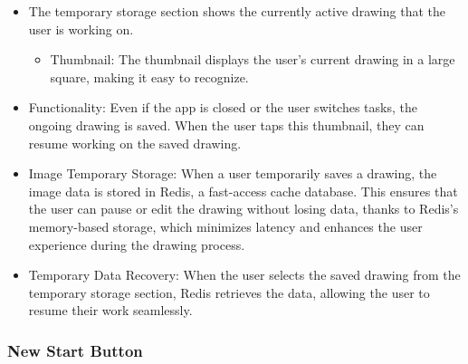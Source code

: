 \documentclass[conference]{IEEEtran}
\begin{document}
\begin{itemize}
    \item The temporary storage section shows the currently active drawing that the user is working on.
\begin{itemize}
    \item Thumbnail: The thumbnail displays the user’s current drawing in a large square, making it easy to recognize.\\
\end{itemize}
    \item Functionality: Even if the app is closed or the user switches tasks, the ongoing drawing is saved. When the user taps this thumbnail, they can resume working on the saved drawing.\\
    \item Image Temporary Storage: When a user temporarily saves a drawing, the image data is stored in Redis, a fast-access cache database. This ensures that the user can pause or edit the drawing without losing data, thanks to Redis’s memory-based storage, which minimizes latency and enhances the user experience during the drawing process.\\
    \item Temporary Data Recovery: When the user selects the saved drawing from the temporary storage section, Redis retrieves the data, allowing the user to resume their work seamlessly.\\

\end{itemize}

\subsubsection{New Start Button}
\end{document}
